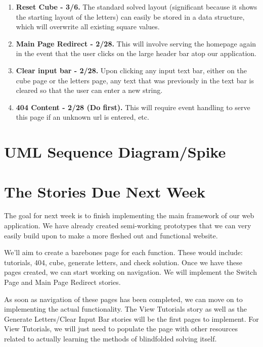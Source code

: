 \documentclass[12pt]{article}
\begin{document}
\begin{enumerate}
	\item \textbf{Reset Cube - 3/6.} The standard solved layout (significant because it shows the starting layout of the letters) can easily be stored in a data structure, which will overwrite all existing square values.
	\item \textbf{Main Page Redirect - 2/28.} This will involve serving the homepage again in the event that the user clicks on the large header bar atop our application.
	\item \textbf{Clear input bar - 2/28.} Upon clicking any input text bar, either on the cube page or the letters page, any text that was previously in the text bar is cleared so that the user can enter a new string.
	\item \textbf{404 Content - 2/28 (Do first).} This will require event handling to serve this page if an unknown url is entered, etc. 
\end{enumerate}

\section{UML Sequence Diagram/Spike}



\section{The Stories Due Next Week}

\par
The goal for next week is to finish implementing the main framework of our web application. We have already created semi-working prototypes that we can very easily build upon to make a more fleshed out and functional website. \\

\par
We’ll aim to create a barebones page for each function. These would include: tutorials, 404, cube, generate letters, and check solution. Once we have these pages created, we can start working on navigation. We will implement the Switch Page and Main Page Redirect stories. \\

\par
As soon as navigation of these pages has been completed, we can move on to implementing the actual functionality. The View Tutorials story as well as the Generate Letters/Clear Input Bar stories will be the first pages to implement. For View Tutorials, we will just need to populate the page with other resources related to actually learning the methods of blindfolded solving itself. \\
\end{document}
